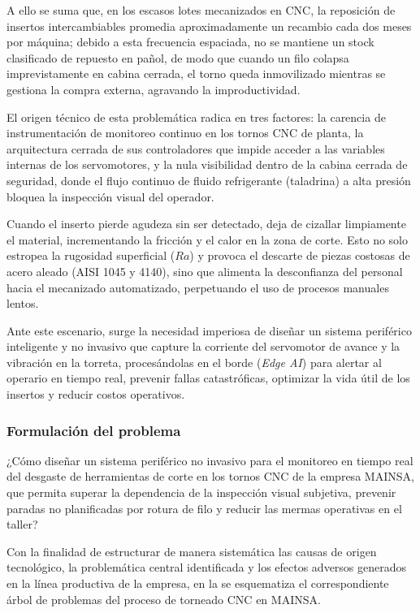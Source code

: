 A ello se suma que, en los escasos lotes mecanizados en CNC, la reposición de insertos intercambiables promedia aproximadamente un recambio cada dos meses por máquina; debido a esta frecuencia espaciada, no se mantiene un stock clasificado de repuesto en pañol, de modo que cuando un filo colapsa imprevistamente en cabina cerrada, el torno queda inmovilizado mientras se gestiona la compra externa, agravando la improductividad.

El origen técnico de esta problemática radica en tres factores: la carencia de instrumentación de monitoreo continuo en los tornos CNC de planta, la arquitectura cerrada de sus controladores que impide acceder a las variables internas de los servomotores, y la nula visibilidad dentro de la cabina cerrada de seguridad, donde el flujo continuo de fluido refrigerante (taladrina) a alta presión bloquea la inspección visual del operador.

Cuando el inserto pierde agudeza sin ser detectado, deja de cizallar limpiamente el material, incrementando la fricción y el calor en la zona de corte. Esto no solo estropea la rugosidad superficial ($Ra$) y provoca el descarte de piezas costosas de acero aleado (AISI 1045 y 4140), sino que alimenta la desconfianza del personal hacia el mecanizado automatizado, perpetuando el uso de procesos manuales lentos.

Ante este escenario, surge la necesidad imperiosa de diseñar un sistema periférico inteligente y no invasivo que capture la corriente del servomotor de avance y la vibración en la torreta, procesándolas en el borde (\textit{Edge AI}) para alertar al operario en tiempo real, prevenir fallas catastróficas, optimizar la vida útil de los insertos y reducir costos operativos.

\clearpage
\subsubsection{Formulación del problema}
\label{subsubsec:formulacion_problema}

¿Cómo diseñar un sistema periférico no invasivo para el monitoreo en tiempo real del desgaste de herramientas de corte en los tornos CNC de la empresa MAINSA, que permita superar la dependencia de la inspección visual subjetiva, prevenir paradas no planificadas por rotura de filo y reducir las mermas operativas en el taller?

Con la finalidad de estructurar de manera sistemática las causas de origen tecnológico, la problemática central identificada y los efectos adversos generados en la línea productiva de la empresa, en la  se esquematiza el correspondiente árbol de problemas del proceso de torneado CNC en MAINSA.

